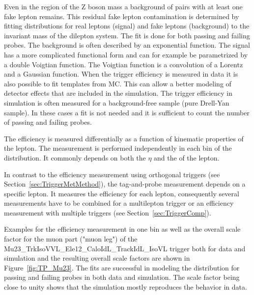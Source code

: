 Even in the region of the Z boson mass a background of pairs with at least one fake lepton remains. This residual fake lepton contamination is determined by fitting distributions for real leptons (signal) and fake leptons (background) to the invariant mass of the dilepton system. The fit is done for both passing and failing probes. The background is often described by an exponential function. The signal has a more complicated functional form and can for example be parametrized by a double Voigtian function. The Voigtian function is a convolution of a Lorentz and a Gaussian function. When the trigger efficiency is measured in data it is also possible to fit templates from MC. This can allow a better modeling of detector effects that are included in the simulation.
The trigger efficiency in simulation is often measured for a background-free sample (pure Drell-Yan sample). In these cases a fit is not needed and it is sufficient to count the number of passing and failing probes.

The efficiency is measured differentially as a function of kinematic properties of the lepton. The measurement is performed independently in each bin of the distribution.
It commonly depends on both the $\eta$ and the \pt of the lepton. 

In contrast to the efficiency measurement using orthogonal triggers (see Section~\ref{sec:TriggerMetMethod}), the tag-and-probe measurement depends on a specific lepton. It measures the efficiency for each lepton, consequently several measurements have to be combined for a multilepton trigger or an efficiency measurement with multiple triggers (see Section~\ref{sec:TriggerComp}). 

Examples for the efficiency measurement in one bin as well as the overall scale factor for the muon part ("muon leg") of the Mu23\_TrkIsoVVL\_Ele12\_CaloIdL\_TrackIdL\_IsoVL trigger both for data and simulation and the resulting overall scale factors are shown in Figure~\ref{fig:TP_Mu23}. The fits are successful in modeling the \mll \; distribution for passing and failing probes in both data and simulation. The scale factor being close to unity shows that the simulation mostly reproduces the behavior in data.

